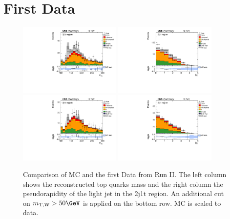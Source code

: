 \section{First Data}

\begin{figure}[!h]
\begin{center}
\includegraphics[angle=00,width=0.45\textwidth]{figures/DATA_2j1t_top_m.pdf}
\includegraphics[angle=00,width=0.45\textwidth]{figures/DATA_2j1t_etajprime.pdf}\\
\includegraphics[angle=00,width=0.45\textwidth]{figures/DATA_2j1t_top_m_mtwcut.pdf}
\includegraphics[angle=00,width=0.45\textwidth]{figures/DATA_2j1t_etajprime_mtwcut.pdf}
\caption{\label{aaa} Comparison of MC and the first Data from Run II. The left column shows the reconstructed top quarks mass and the right column the pseudorapidity of the light jet in the 2j1t region. An additional cut on $m_{\text{T,W}} > 50 \GeV$ is applied on the bottom row. MC is scaled to data.}
\end{center}
\end{figure}


